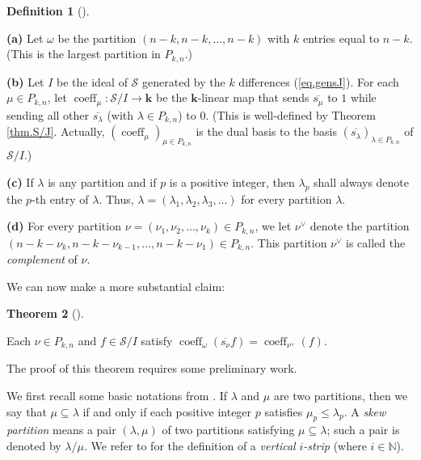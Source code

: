 \documentclass[numbers=enddot,12pt,final,onecolumn,notitlepage]{scrartcl}%
\theoremstyle{definition}
\newtheorem{theo}{Theorem}[section]
\newenvironment{theorem}[1][]
{\begin{theo}[#1]\begin{leftbar}}
{\end{leftbar}\end{theo}}
\newtheorem{defi}[theo]{Definition}
\newenvironment{definition}[1][]
{\begin{defi}[#1]\begin{leftbar}}
{\end{leftbar}\end{defi}}
\begin{document}
\begin{definition}
\label{def.omega-and-complement}\textbf{(a)} Let $\omega$ be the partition
$\left(  n-k,n-k,\ldots,n-k\right)  $ with $k$ entries equal to $n-k$. (This
is the largest partition in $P_{k,n}$.)

\textbf{(b)} Let $I$ be the ideal of $\mathcal{S}$ generated by the $k$
differences (\ref{eq.gensJ}). For each $\mu\in P_{k,n}$, let
$\operatorname*{coeff}\nolimits_{\mu}:\mathcal{S}/I\rightarrow\mathbf{k}$ be
the $\mathbf{k}$-linear map that sends $\overline{s_{\mu}}$ to $1$ while
sending all other $\overline{s_{\lambda}}$ (with $\lambda\in P_{k,n}$) to $0$.
(This is well-defined by Theorem \ref{thm.S/J}. Actually, $\left(
\operatorname*{coeff}\nolimits_{\mu}\right)  _{\mu\in P_{k,n}}$ is the dual
basis to the basis $\left(  \overline{s_{\lambda}}\right)  _{\lambda\in
P_{k,n}}$ of $\mathcal{S}/I$.)

\textbf{(c)} If $\lambda$ is any partition and if $p$ is a positive integer,
then $\lambda_{p}$ shall always denote the $p$-th entry of $\lambda$. Thus,
$\lambda=\left(  \lambda_{1},\lambda_{2},\lambda_{3},\ldots\right)  $ for
every partition $\lambda$.

\textbf{(d)} For every partition $\nu=\left(  \nu_{1},\nu_{2},\ldots,\nu
_{k}\right)  \in P_{k,n}$, we let $\nu^{\vee}$ denote the partition $\left(
n-k-\nu_{k},n-k-\nu_{k-1},\ldots,n-k-\nu_{1}\right)  \in P_{k,n}$. This
partition $\nu^{\vee}$ is called the \textit{complement} of $\nu$.
\end{definition}

We can now make a more substantial claim:

\begin{theorem}
\label{thm.coeffw}Each $\nu\in P_{k,n}$ and $f\in\mathcal{S}/I$ satisfy
$\operatorname*{coeff}\nolimits_{\omega}\left(  \overline{s_{\nu}}f\right)
=\operatorname*{coeff}\nolimits_{\nu^{\vee}}\left(  f\right)  $.
\end{theorem}

The proof of this theorem requires some preliminary work.

We first recall some basic notations from \cite[Chapter 2]{GriRei18}. If
$\lambda$ and $\mu$ are two partitions, then we say that $\mu\subseteq\lambda$
if and only if each positive integer $p$ satisfies $\mu_{p}\leq\lambda_{p}$. A
\textit{skew partition} means a pair $\left(  \lambda,\mu\right)  $ of two
partitions satisfying $\mu\subseteq\lambda$; such a pair is denoted by
$\lambda/\mu$. We refer to \cite[\S 2.7]{GriRei18} for the definition of a
\textit{vertical }$i$\textit{-strip} (where $i\in\mathbb{N}$).
\end{document}
